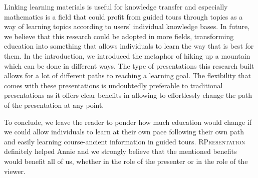 \documentclass{llncs}
\newcommand{\sys}{\textsc{RPresentation}\xspace}
\begin{document}
Linking learning materials is useful for knowledge transfer and especially mathematics is a field that could profit from guided tours through topics as a way of learning topics according to users' individual knowledge bases. In future, we believe that this research could be adopted in more fields, transforming education into something that allows individuals to learn the way that is best for them. In the introduction, we introduced the metaphor of hiking up a mountain which can be done in different ways. The type of presentations this research built allows for a lot of different paths to reaching a learning goal. The flexibility that comes with these presentations is undoubtedly preferable to traditional presentations as it offers clear benefits in allowing to effortlessly change the path of the presentation at any point.

To conclude, we leave the reader to ponder how much education would change if we could allow individuals to learn at their own pace following their own path and easily learning course-ancient information in guided tours. \sys definitely helped Annie and we strongly believe that the mentioned benefits would benefit all of us, whether in the role of the presenter or in the role of the viewer.




\end{document}
